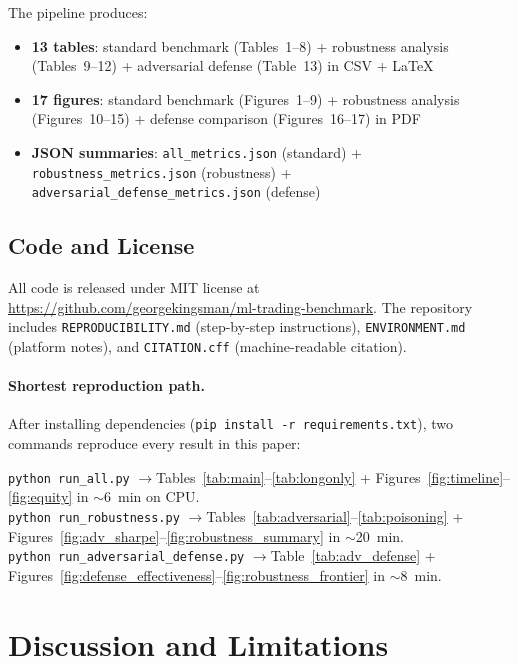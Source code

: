 \documentclass[preprint,review,12pt]{elsarticle}
\begin{document}
The pipeline produces:
\begin{itemize}[leftmargin=1.4em]
  \item \textbf{13 tables}: standard benchmark (Tables~1--8) + robustness analysis (Tables~9--12) + adversarial defense (Table~13) in CSV + \LaTeX
  \item \textbf{17 figures}: standard benchmark (Figures~1--9) + robustness analysis (Figures~10--15) + defense comparison (Figures~16--17) in PDF
  \item \textbf{JSON summaries}: \texttt{all\_metrics.json} (standard) + \texttt{robustness\_metrics.json} (robustness) + \texttt{adversarial\_defense\_metrics.json} (defense)
\end{itemize}

\subsection{Code and License}

All code is released under MIT license at \url{https://github.com/georgekingsman/ml-trading-benchmark}.
The repository includes \texttt{REPRODUCIBILITY.md} (step-by-step instructions), \texttt{ENVIRONMENT.md} (platform notes), and \texttt{CITATION.cff} (machine-readable citation).

\paragraph{Shortest reproduction path.}
After installing dependencies (\texttt{pip install -r requirements.txt}), two commands reproduce every result in this paper:
\begin{center}
\texttt{python run\_all.py} \quad$\longrightarrow$\quad Tables~\ref{tab:main}--\ref{tab:longonly} + Figures~\ref{fig:timeline}--\ref{fig:equity} in {$\sim$6~min} on CPU.\\
\texttt{python run\_robustness.py} \quad$\longrightarrow$\quad Tables~\ref{tab:adversarial}--\ref{tab:poisoning} + Figures~\ref{fig:adv_sharpe}--\ref{fig:robustness_summary} in {$\sim$20~min}.\\
\texttt{python run\_adversarial\_defense.py} \quad$\longrightarrow$\quad Table~\ref{tab:adv_defense} + Figures~\ref{fig:defense_effectiveness}--\ref{fig:robustness_frontier} in {$\sim$8~min}.
\end{center}


\section{Discussion and Limitations}
\label{sec:discussion}
\end{document}
